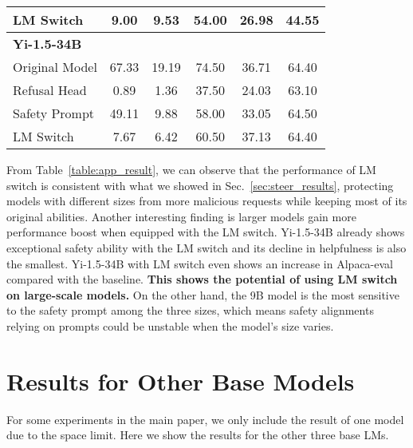 \begin{table*}[h]
\begin{tabular}{lccccc}
LM Switch          & 9.00                             & 9.53                          & 54.00                             & 26.98                            & 44.55                         \\ \hline
\textbf{Yi-1.5-34B} & \multicolumn{1}{l}{}             & \multicolumn{1}{l}{}          & \multicolumn{1}{l}{}              & \multicolumn{1}{l}{}             & \multicolumn{1}{l}{}          \\
Original Model      & 67.33                            & 19.19                         & 74.50                             & 36.71                            & 64.40                         \\
Refusal Head      & 0.89                             & 1.36                          & 37.50                             & 24.03                            & 63.10                         \\
Safety Prompt      & 49.11                            & 9.88                          & 58.00                             & 33.05                            & 64.50                         \\
LM Switch          & 7.67                             & 6.42                          & 60.50                             & 37.13                            & 64.40                         \\ \hline
\end{tabular}
\end{table*}

From Table~\ref{table:app_result}, we can observe that the performance of LM switch is consistent with what we showed in Sec.~\ref{sec:steer_results}, protecting models with different sizes from more malicious requests while keeping most of its original abilities. Another interesting finding is larger models gain more performance boost when equipped with the LM switch. Yi-1.5-34B already shows exceptional safety ability with the LM switch and its decline in helpfulness is also the smallest. Yi-1.5-34B with LM switch even shows an increase in Alpaca-eval compared with the baseline. \textbf{This shows the potential of using LM switch on large-scale models.} On the other hand, the 9B model is the most sensitive to the safety prompt among the three sizes, which means safety alignments relying on prompts could be unstable when the model's size varies.



\section{Results for Other Base Models}
\label{app:result}
For some experiments in the main paper, we only include the result of one model due to the space limit. Here we show the results for the other three base LMs.

